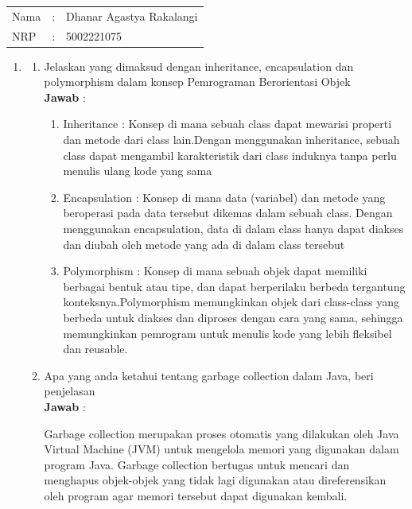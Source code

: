 \documentclass[a4paper, 12pt]{article}
\newcommand{\ans}{\textbf{Jawab} :}
\begin{document}
    \begin{tabular}{|lcl|}
     \hline
     Nama&:&Dhanar Agastya Rakalangi\\
     NRP&:&5002221075\\
     \hline
    \end{tabular}

    \begin{enumerate}
        \item 
        \begin{enumerate}
            \item Jelaskan yang dimaksud dengan inheritance, encapsulation dan 	polymorphism dalam konsep Pemrograman Berorientasi Objek\\
            
            \ans
        
            \begin{enumerate}[label=\textbullet]
                \item Inheritance : Konsep di mana sebuah class dapat mewarisi properti dan metode dari class lain.Dengan menggunakan inheritance, sebuah class dapat mengambil karakteristik dari class induknya tanpa perlu menulis ulang kode yang sama
            
                \item Encapsulation : Konsep di mana data (variabel) dan metode yang beroperasi pada data tersebut dikemas dalam sebuah class. Dengan menggunakan encapsulation, data di dalam class hanya dapat diakses dan diubah oleh metode yang ada di dalam class tersebut
    
                \item Polymorphism : Konsep di mana sebuah objek dapat memiliki berbagai bentuk atau tipe, dan dapat berperilaku berbeda tergantung konteksnya.Polymorphism memungkinkan objek dari class-class yang berbeda untuk diakses dan diproses dengan cara yang sama, sehingga memungkinkan pemrogram untuk menulis kode yang lebih fleksibel dan reusable.
            \end{enumerate}

            \item Apa yang anda ketahui tentang garbage collection dalam Java, beri penjelasan \\
            
            \ans
            
            Garbage collection merupakan proses otomatis yang dilakukan oleh Java Virtual Machine (JVM) untuk mengelola memori yang digunakan dalam program Java. Garbage collection bertugas untuk mencari dan menghapus objek-objek yang tidak lagi digunakan atau direferensikan oleh program agar memori tersebut dapat digunakan kembali.


\end{enumerate}
\end{enumerate}
\end{document}
